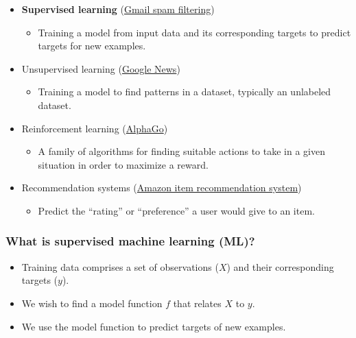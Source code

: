 \documentclass[11pt]{article}
\providecommand{\tightlist}{%
      \setlength{\itemsep}{0pt}\setlength{\parskip}{0pt}}
\begin{document}
\begin{itemize}
\tightlist
\item
  \textbf{Supervised learning}
  (\href{https://support.google.com/a/answer/2368132?hl=en}{Gmail spam
  filtering})

  \begin{itemize}
  \tightlist
  \item
    Training a model from input data and its corresponding targets to
    predict targets for new examples.\\
  \end{itemize}
\item
  Unsupervised learning (\href{https://news.google.com/}{Google News})

  \begin{itemize}
  \tightlist
  \item
    Training a model to find patterns in a dataset, typically an
    unlabeled dataset.
  \end{itemize}
\item
  Reinforcement learning
  (\href{https://deepmind.com/research/case-studies/alphago-the-story-so-far}{AlphaGo})

  \begin{itemize}
  \tightlist
  \item
    A family of algorithms for finding suitable actions to take in a
    given situation in order to maximize a reward.
  \end{itemize}
\item
  Recommendation systems
  (\href{https://www.cs.umd.edu/~samir/498/Amazon-Recommendations.pdf}{Amazon
  item recommendation system})

  \begin{itemize}
  \tightlist
  \item
    Predict the ``rating'' or ``preference'' a user would give to an
    item.
  \end{itemize}
\end{itemize}

    \subsubsection{What is supervised machine learning
(ML)?}\label{what-is-supervised-machine-learning-ml}

\begin{itemize}
\tightlist
\item
  Training data comprises a set of observations (\(X\)) and their
  corresponding targets (\(y\)).
\item
  We wish to find a model function \(f\) that relates \(X\) to \(y\).
\item
  We use the model function to predict targets of new examples.
\end{itemize}
\end{document}
